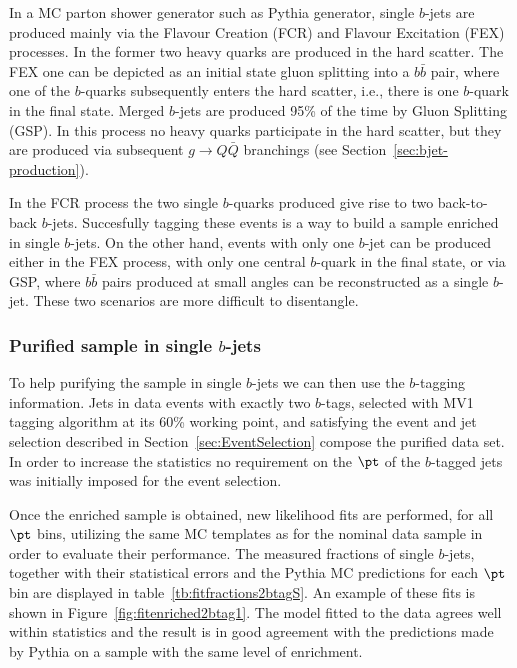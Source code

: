 In a MC parton shower generator such as {\sc Pythia} generator, single $b$-jets are produced mainly via the Flavour Creation (FCR) and Flavour Excitation (FEX) processes.  In the former two heavy quarks are produced in the hard scatter. The FEX one can be depicted as an initial state gluon splitting into a $b\bar{b}$ pair, where one of the $b$-quarks subsequently enters the hard scatter, i.e., there is one $b$-quark in the final state.
Merged $b$-jets are produced 95\% of the time by Gluon Splitting (GSP). In this process no heavy quarks participate in the hard scatter, but they are produced via subsequent $g \rightarrow Q\bar{Q}$ branchings (see Section~\ref{sec:bjet-production}).

In the FCR process the two single $b$-quarks produced give rise to two back-to-back $b$-jets. Succesfully tagging these events is a way to build a sample enriched in single $b$-jets.  On the other hand, events with only one $b$-jet can be produced either in the FEX process, with only one central $b$-quark in the final state, or via GSP, where $b\bar{b}$ pairs produced at small angles can be reconstructed as a single $b$-jet. These two scenarios are more difficult to disentangle. %

\subsubsection{Purified sample in single $b$-jets}

To help purifying the sample in single $b$-jets we can then use the $b$-tagging information. Jets in data events with exactly two $b$-tags, selected with MV1 tagging algorithm at its 60\% working point, and satisfying the event and jet selection described in Section~\ref{sec:EventSelection} compose the purified data set.  In order to increase the statistics no requirement on the $\pt$ of the $b$-tagged jets was initially imposed for the event selection. 

Once the enriched sample is obtained, new likelihood fits are performed, for all $\pt$ bins, utilizing the same MC templates as for the nominal data sample in order to evaluate their performance.  
The measured fractions of single $b$-jets, together with their statistical errors and the {\sc Pythia} MC predictions for each $\pt$ bin are displayed in table~\ref{tb:fitfractions2btagS}. An example of these fits is shown  in  Figure~\ref{fig:fitenriched2btag1}. %
 The model fitted to the data agrees well within statistics and the result is in good agreement with the predictions made by {\sc Pythia} on a sample with the same level of enrichment.  


